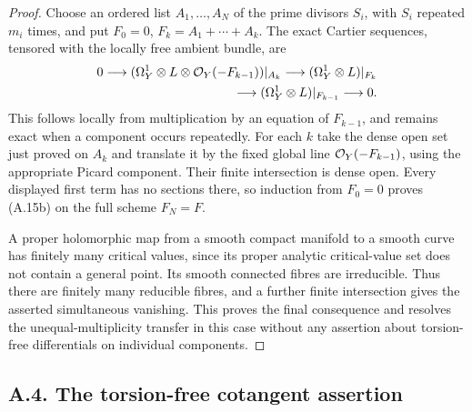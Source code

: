 \begin{proof}
Choose an ordered list $A_1,\ldots,A_N$ of the prime divisors $S_i$, with $S_i$ repeated $m_i$ times, and put $F_0=0$, $F_k=A_1+\cdots+A_k$. The exact Cartier sequences, tensored with the locally free ambient bundle, are
\[
\begin{split}
0\longrightarrow
 (\Omega_Y^1\otimes L\otimes\mathcal O_Y(-F_{k-1}))|_{A_k}
 \longrightarrow (\Omega_Y^1\otimes L)|_{F_k}\\
 \longrightarrow(\Omega_Y^1\otimes L)|_{F_{k-1}}
 \longrightarrow0.
\end{split}
\]
This follows locally from multiplication by an equation of $F_{k-1}$, and remains exact when a component occurs repeatedly. For each $k$ take the dense open set just proved on $A_k$ and translate it by the fixed global line $\mathcal O_Y(-F_{k-1})$, using the appropriate Picard component. Their finite intersection is dense open. Every displayed first term has no sections there, so induction from $F_0=0$ proves (A.15b) on the full scheme $F_N=F$.

A proper holomorphic map from a smooth compact manifold to a smooth curve has finitely many critical values, since its proper analytic critical-value set does not contain a general point. Its smooth connected fibres are irreducible. Thus there are finitely many reducible fibres, and a further finite intersection gives the asserted simultaneous vanishing. This proves the final consequence and resolves the unequal-multiplicity transfer in this case without any assertion about torsion-free differentials on individual components.
\end{proof}


\subsection{A.4. The torsion-free cotangent assertion}


